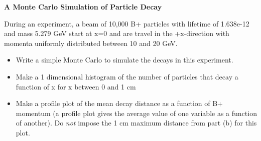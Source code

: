 \documentclass[12pt]{article}
\begin{document}
\begin{center}
  {\large\bf A Monte Carlo Simulation of Particle Decay}
\end{center}
\vskip0.2in
During an experiment, a beam of 10,000 B+ particles with lifetime of 1.638e-12 and mass
5.279 GeV start at x=0 and are travel in the +x-direction with momenta 
uniformly distributed between 10 and 20 GeV.  
\begin{itemize}
  \item Write a simple Monte Carlo to simulate the decays in this experiment.
 \item  Make a 1 dimensional histogram of the number of particles that decay 
 a function of x for x between 0 and 1 cm 
\item Make a profile plot of the mean decay distance as a function of 
B+ momentum (a profile plot gives the average value of one variable as a function
of another).  Do {\it not} impose the 1 cm maximum distance from part (b) for this plot.
\end{itemize}
\end{document}

